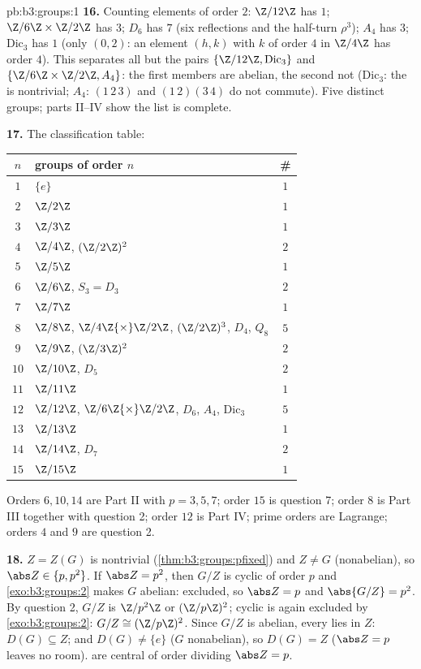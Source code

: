 \begin{solution}{pb:b3:groups:1}
\textbf{16.} Counting elements of order $2$: $\Z/12\Z$ has $1$;
$\Z/6\Z\times\Z/2\Z$ has $3$; $D_6$ has $7$ (six reflections and
the half-turn $\rho^3$); $A_4$ has $3$; $\mathrm{Dic}_3$ has $1$
(only $(0, 2)$: an element $(h, k)$ with $k$ of order $4$ in
$\Z/4\Z$ has order $4$). This separates all but the pairs
$\{\Z/12\Z, \mathrm{Dic}_3\}$ and $\{\Z/6\Z\times\Z/2\Z, A_4\}$:
the first members are abelian, the second not ($\mathrm{Dic}_3$:
the  is nontrivial; $A_4$: $(1\,2\,3)$ and
$(1\,2)(3\,4)$ do not commute). Five distinct groups; parts
II--IV show the list is complete.

\textbf{17.} The classification table:
\begin{center}
\begin{tabular}{c l c}
$n$ & groups of order $n$ & \#\\
\hline
$1$ & $\{e\}$ & $1$\\
$2$ & $\Z/2\Z$ & $1$\\
$3$ & $\Z/3\Z$ & $1$\\
$4$ & $\Z/4\Z$, $(\Z/2\Z)^2$ & $2$\\
$5$ & $\Z/5\Z$ & $1$\\
$6$ & $\Z/6\Z$, $S_3 = D_3$ & $2$\\
$7$ & $\Z/7\Z$ & $1$\\
$8$ & $\Z/8\Z$, $\Z/4\Z{\times}\Z/2\Z$, $(\Z/2\Z)^3$, $D_4$,
      $Q_8$ & $5$\\
$9$ & $\Z/9\Z$, $(\Z/3\Z)^2$ & $2$\\
$10$ & $\Z/10\Z$, $D_5$ & $2$\\
$11$ & $\Z/11\Z$ & $1$\\
$12$ & $\Z/12\Z$, $\Z/6\Z{\times}\Z/2\Z$, $D_6$, $A_4$,
       $\mathrm{Dic}_3$ & $5$\\
$13$ & $\Z/13\Z$ & $1$\\
$14$ & $\Z/14\Z$, $D_7$ & $2$\\
$15$ & $\Z/15\Z$ & $1$\\
\end{tabular}
\end{center}
Orders $6, 10, 14$ are Part II with $p = 3, 5, 7$; order $15$ is
question 7; order $8$ is Part III together with question 2; order
$12$ is Part IV; prime orders are Lagrange; orders $4$ and $9$
are question 2.

\textbf{18.} $Z = Z(G)$ is nontrivial
(\cref{thm:b3:groups:pfixed}) and $Z \neq G$ (nonabelian), so
$\abs Z \in \{p, p^2\}$. If $\abs Z = p^2$, then $G/Z$ is cyclic
of order $p$ and \cref{exo:b3:groups:2} makes $G$ abelian:
excluded, so $\abs Z = p$ and $\abs{G/Z} = p^2$. By question 2,
$G/Z$ is $\Z/p^2\Z$ or $(\Z/p\Z)^2$; cyclic is again excluded by
\cref{exo:b3:groups:2}: $G/Z \cong (\Z/p\Z)^2$. Since $G/Z$ is
abelian, every  lies in $Z$: $D(G) \subseteq Z$; and
$D(G) \neq \{e\}$ ($G$ nonabelian), so $D(G) = Z$ ($\abs Z = p$
leaves no room).  are central of order dividing
$\abs Z = p$.


\end{solution}
